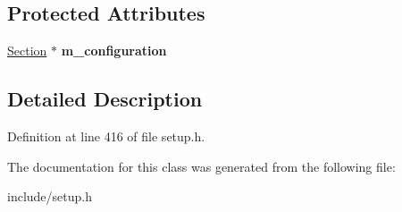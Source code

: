 \subsection*{Protected Attributes}
\begin{DoxyCompactItemize}
\item 
\hypertarget{classModule__base_aceab15faaa79b216f6d417b0c80fdce6}{\hyperlink{classSection}{Section} $\ast$ {\bfseries m\-\_\-configuration}}\label{classModule__base_aceab15faaa79b216f6d417b0c80fdce6}

\end{DoxyCompactItemize}


\subsection{Detailed Description}


Definition at line 416 of file setup.\-h.



The documentation for this class was generated from the following file\-:\begin{DoxyCompactItemize}
\item 
include/setup.\-h\end{DoxyCompactItemize}
